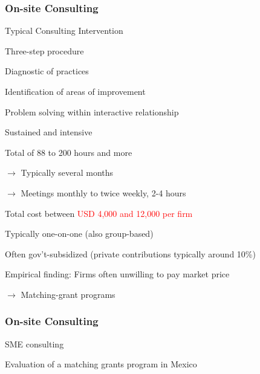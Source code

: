 \documentclass[hideothersubsections, usenames,dvipsnames,11pt]{beamer}
\newenvironment{itemize_2pt}{\itemize\addtolength{\itemsep}{2pt}}{\enditemize}
\newenvironment{enumerate_2pt}{\enumerate\addtolength{\itemsep}{2pt}}{\endenumerate}
\begin{document}
\begin{frame}
\frametitle{On-site Consulting}

Typical Consulting Intervention
\begin{itemize_2pt}
	\item Three-step procedure
	\begin{enumerate_2pt}
		\item Diagnostic of practices
		\item Identification of areas of improvement
		\item Problem solving within interactive relationship
	\end{enumerate_2pt}
	
	\pause
	
	\item \textcolor{bdf}{Sustained and intensive}
	\begin{itemize_2pt}
		\item Total of 88 to 200 hours and more \citep{Anderson2020, Bruhn2018, Karlan2015, Bruhn2019}
		\item[] $\rightarrow$ Typically several months
		\item[] $\rightarrow$ Meetings monthly to twice weekly, 2-4 hours
		\item Total cost between \textcolor{red}{USD 4,000 and 12,000 per firm} \citep{Anderson2020, Bruhn2018}
	\end{itemize_2pt}
	
	\pause
	
	\item Typically one-on-one (also group-based)
	
	\item \textcolor{bdf}{Often gov't-subsidized} (private contributions typically around 10\%)
	\begin{itemize_2pt}
		\item Empirical finding: Firms often unwilling to pay market price \citep{Maffioli2020}
		\item[] $\rightarrow$ \textcolor{bdf}{Matching-grant programs}
	\end{itemize_2pt}
	
\end{itemize_2pt}
\end{frame}


\begin{frame}
\frametitle{On-site Consulting}

SME consulting \citep{Bruhn2018}
\begin{itemize_2pt}
	\item Evaluation of a matching grants program in Mexico
	\begin{itemize_2pt}
		\item
	\end{itemize_2pt}
\end{itemize_2pt}


\end{frame}
\end{document}
